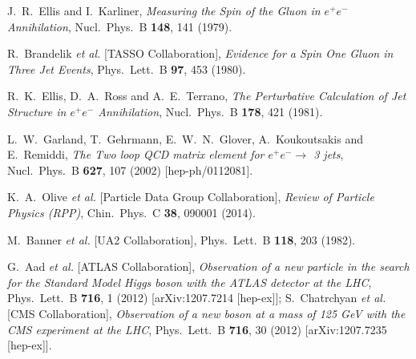 \documentclass{ws-rv975x65}[12pt]
\begin{document}
\begin{thebibliography}{9}
J.~R.~Ellis and I.~Karliner,
{\it Measuring the Spin of the Gluon in $e^+ e^-$ Annihilation},
  Nucl.\ Phys.\ B {\bf 148}, 141 (1979).

R.~Brandelik {\it et al.}  [TASSO Collaboration],
{\it Evidence for a Spin One Gluon in Three Jet Events},
  Phys.\ Lett.\ B {\bf 97}, 453 (1980).
 
R.~K.~Ellis, D.~A.~Ross and A.~E.~Terrano,
{\it The Perturbative Calculation of Jet Structure in $e^+ e^-$ Annihilation},
  Nucl.\ Phys.\ B {\bf 178}, 421 (1981).

L.~W.~Garland, T.~Gehrmann, E.~W.~N.~Glover, A.~Koukoutsakis and E.~Remiddi,
 {\it The Two loop QCD matrix element for $e^+ e^- \to$ 3 jets},
  Nucl.\ Phys.\ B {\bf 627}, 107 (2002)
  [hep-ph/0112081].

K.~A.~Olive {\it et al.}  [Particle Data Group Collaboration],
{\it Review of Particle Physics (RPP)},
  Chin.\ Phys.\ C {\bf 38}, 090001 (2014).

M.~Banner {\it et al.}  [UA2 Collaboration],
  Phys.\ Lett.\ B {\bf 118}, 203 (1982).

G.~Aad {\it et al.}  [ATLAS Collaboration],
{\it Observation of a new particle in the search for the Standard Model Higgs boson with the ATLAS detector at the LHC},
  Phys.\ Lett.\ B {\bf 716}, 1 (2012)
  [arXiv:1207.7214 [hep-ex]];
  S.~Chatrchyan {\it et al.}  [CMS Collaboration],
{\it Observation of a new boson at a mass of 125 GeV with the CMS experiment at the LHC},
  Phys.\ Lett.\ B {\bf 716}, 30 (2012)
  [arXiv:1207.7235 [hep-ex]].

\end{thebibliography}
\end{document}
